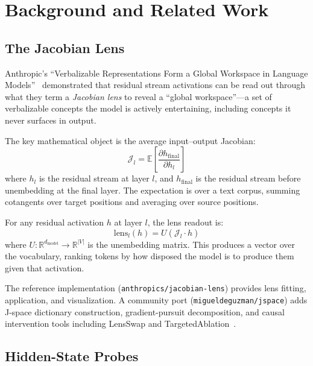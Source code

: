 \documentclass[11pt,twocolumn]{article}
\newcommand{\lens}{\mathcal{J}}
\newcommand{\unembed}{U}
\newcommand{\vocab}{V}
\begin{document}
\section{Background and Related Work}

\label{sec:background}

\subsection{The Jacobian Lens}

Anthropic's ``Verbalizable Representations Form a Global Workspace in Language Models''~\cite{anthropic2026workspace} demonstrated that residual stream activations can be read out through what they term a \emph{Jacobian lens} to reveal a ``global workspace''---a set of verbalizable concepts the model is actively entertaining, including concepts it never surfaces in output.

The key mathematical object is the average input--output Jacobian:
\begin{equation}
\lens_l = \mathbb{E}\!\left[\frac{\partial h_{\text{final}}}{\partial h_l}\right]
\label{eq:jacobian}
\end{equation}
where $h_l$ is the residual stream at layer $l$, and $h_{\text{final}}$ is the residual stream before unembedding at the final layer. The expectation is over a text corpus, summing cotangents over target positions and averaging over source positions.

For any residual activation $h$ at layer $l$, the lens readout is:
\begin{equation}
\text{lens}_l(h) = \unembed(\lens_l \cdot h)
\label{eq:lens_readout}
\end{equation}
where $\unembed : \mathbb{R}^{d_{\text{model}}} \to \mathbb{R}^{|\vocab|}$ is the unembedding matrix. This produces a vector over the vocabulary, ranking tokens by how disposed the model is to produce them given that activation.

The reference implementation (\texttt{anthropics/jacobian-lens}) provides lens fitting, application, and visualization. A community port (\texttt{migueldeguzman/jspace}) adds J-space dictionary construction, gradient-pursuit decomposition, and causal intervention tools including LensSwap and TargetedAblation~\cite{jspace2026}.

\subsection{Hidden-State Probes}
\end{document}
